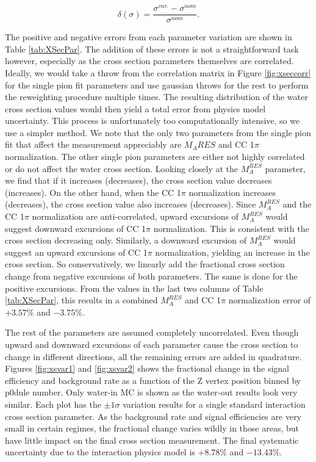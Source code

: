 \begin{equation}
\delta(\sigma) = \frac{\sigma^{var.}-\sigma^{nom}}{\sigma^{nom}}.
\end{equation}

The positive and negative errors from each parameter variation are shown in Table \ref{tab:XSecPar}. The addition of these errors is not a straightforward task however, especially as the cross section parameters themselves are correlated. Ideally, we would take a throw from the correlation matrix in Figure \ref{fig:xseccorr} for the single pion fit parameters and use gaussian throws for the rest to perform the reweighting procedure multiple times. The resulting distribution of the water cross section values would then yield a total error from physics model uncertainty. This process is unfortunately too computationally intensive, so we use a simpler method. We note that the only two parameters from the single pion fit that affect the measurement appreciably are $M_A{RES}$ and CC 1$\pi$ normalization. The other single pion parameters are either not highly correlated or do not affect the water cross section. Looking closely at the $M_A^{RES}$ parameter, we find that if it increases (decreases), the cross section value decreases (increases). On the other hand, when the CC 1$\pi$ normalization increases (decreases), the cross section value also increases (decreases). Since $M_A^{RES}$ and the CC 1$\pi$ normalization are anti-correlated, upward excursions of $M_A^{RES}$ would suggest downward excursions of CC 1$\pi$ normalization. This is consistent with the cross section decreasing only. Similarly, a downward excursion of $M_A^{RES}$ would suggest an upward excursions of CC 1$\pi$ normalization, yielding an increase in the cross section. So conservatively, we linearly add the fractional cross section change from negative excursions of both parameters. The same is done for the positive excursions. From the values in the last two columns of Table \ref{tab:XSecPar}, this results in a combined $M_A^{RES}$ and CC 1$\pi$ normalization error of $+3.57\%$ and $-3.75\%$.

The rest of the parameters are assumed completely uncorrelated. Even though upward and downward excursions of each parameter cause the cross section to change in different directions, all the remaining errors are added in quadrature. Figures \ref{fig:xsvar1} and \ref{fig:xsvar2} shows the fractional change in the signal efficiency and background rate as a function of the Z vertex position binned by p0dule number. Only water-in MC is shown as the water-out results look very similar. Each plot has the $\pm 1 \sigma$ variation results for a single standard interaction cross section parameter. As the background rate and signal efficiencies are very small in certain regimes, the fractional change varies wildly in those areas, but have little impact on the final cross section measurement. The final systematic uncertainty due to the interaction physics model is $+8.78\%$ and $-13.43\%$. 


